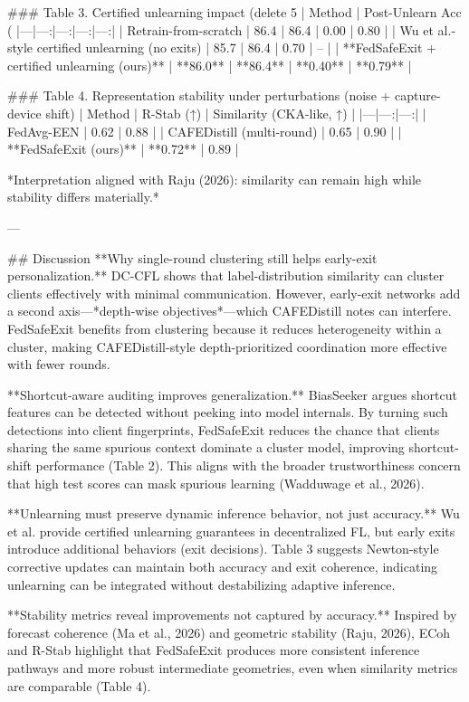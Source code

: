 ### Table 3. Certified unlearning impact (delete 5%
| Method | Post-Unlearn Acc (%
|---|---:|---:|---:|---:|
| Retrain-from-scratch | 86.4 | 86.4 | 0.00 | 0.80 |
| Wu et al.-style certified unlearning (no exits) | 85.7 | 86.4 | 0.70 | – |
| **FedSafeExit + certified unlearning (ours)** | **86.0** | **86.4** | **0.40** | **0.79** |

### Table 4. Representation stability under perturbations (noise + capture-device shift)
| Method | R-Stab (↑) | Similarity (CKA-like, ↑) |
|---|---:|---:|
| FedAvg-EEN | 0.62 | 0.88 |
| CAFEDistill (multi-round) | 0.65 | 0.90 |
| **FedSafeExit (ours)** | **0.72** | 0.89 |

*Interpretation aligned with Raju (2026): similarity can remain high while stability differs materially.*

---

## Discussion  
**Why single-round clustering still helps early-exit personalization.** DC-CFL shows that label-distribution similarity can cluster clients effectively with minimal communication. However, early-exit networks add a second axis—*depth-wise objectives*—which CAFEDistill notes can interfere. FedSafeExit benefits from clustering because it reduces heterogeneity within a cluster, making CAFEDistill-style depth-prioritized coordination more effective with fewer rounds.

**Shortcut-aware auditing improves generalization.** BiasSeeker argues shortcut features can be detected without peeking into model internals. By turning such detections into client fingerprints, FedSafeExit reduces the chance that clients sharing the same spurious context dominate a cluster model, improving shortcut-shift performance (Table 2). This aligns with the broader trustworthiness concern that high test scores can mask spurious learning (Wadduwage et al., 2026).

**Unlearning must preserve dynamic inference behavior, not just accuracy.** Wu et al. provide certified unlearning guarantees in decentralized FL, but early exits introduce additional behaviors (exit decisions). Table 3 suggests Newton-style corrective updates can maintain both accuracy and exit coherence, indicating unlearning can be integrated without destabilizing adaptive inference.

**Stability metrics reveal improvements not captured by accuracy.** Inspired by forecast coherence (Ma et al., 2026) and geometric stability (Raju, 2026), ECoh and R-Stab highlight that FedSafeExit produces more consistent inference pathways and more robust intermediate geometries, even when similarity metrics are comparable (Table 4).


